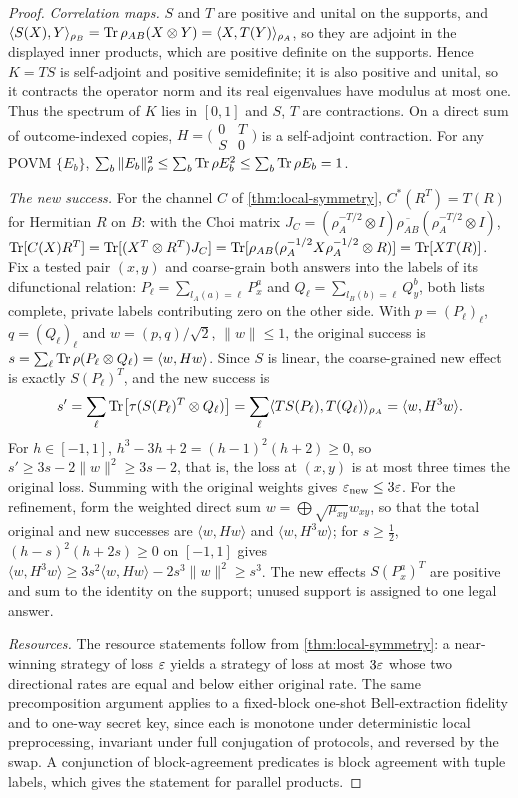 \begin{proof}
\emph{Correlation maps.} $S$ and $T$ are positive and unital on the supports, and
$\langle S(X),Y\rangle_{\rho_B}=\operatorname{Tr}\rho_{AB}(X\otimes Y)=\langle X,T(Y)\rangle_{\rho_A}$, so they are adjoint in the displayed inner
products, which are positive definite on the supports. Hence $K=TS$ is self-adjoint and positive semidefinite; it is also
positive and unital, so it contracts the operator norm and its real eigenvalues have modulus at most one. Thus the
spectrum of $K$ lies in $[0,1]$ and $S$, $T$ are contractions. On a direct sum of outcome-indexed copies,
$H=\bigl(\begin{smallmatrix}0&T\\S&0\end{smallmatrix}\bigr)$ is a self-adjoint contraction. For any POVM $\{E_b\}$,
$\sum_b\|E_b\|_\rho^2\le\sum_b\operatorname{Tr}\rho E_b^2\le\sum_b\operatorname{Tr}\rho E_b=1$.

\emph{The new success.} For the channel $C$ of \cref{thm:local-symmetry}, $C^*(R^T)=T(R)$ for Hermitian $R$ on $B$: with the
Choi matrix $J_C=(\rho_A^{-T/2}\otimes I)\overline{\rho_{AB}}(\rho_A^{-T/2}\otimes I)$,
$\operatorname{Tr}[C(X)R^T]=\operatorname{Tr}[(X^T\otimes R^T)J_C]=\operatorname{Tr}[\rho_{AB}(\rho_A^{-1/2}X\rho_A^{-1/2}\otimes R)]=\operatorname{Tr}[XT(R)]$. Fix a tested pair $(x,y)$ and
coarse-grain both answers into the labels of its difunctional relation: $P_\ell=\sum_{l_A(a)=\ell}P_x^a$ and
$Q_\ell=\sum_{l_B(b)=\ell}Q_y^b$, both lists complete, private labels contributing zero on the other side. With
$p=(P_\ell)_\ell$, $q=(Q_\ell)_\ell$ and $w=(p,q)/\sqrt2$, $\|w\|\le1$, the original success is
$s=\sum_\ell\operatorname{Tr}\rho(P_\ell\otimes Q_\ell)=\langle w,Hw\rangle$. Since $S$ is linear, the coarse-grained new effect is exactly
$S(P_\ell)^T$, and the new success is
\[
s'=\sum_\ell\operatorname{Tr}\bigl[\tau(S(P_\ell)^T\otimes Q_\ell)\bigr]=\sum_\ell\langle TS(P_\ell),T(Q_\ell)\rangle_{\rho_A}=\langle w,H^3w\rangle .
\]
For $h\in[-1,1]$, $h^3-3h+2=(h-1)^2(h+2)\ge0$, so $s'\ge3s-2\|w\|^2\ge3s-2$, that is, the loss at $(x,y)$ is at most three
times the original loss. Summing with the original weights gives $\varepsilon_{\mathrm{new}}\le3\varepsilon$. For the refinement, form the
weighted direct sum $w=\bigoplus\sqrt{\mu_{xy}}w_{xy}$, so that the total original and new successes are $\langle w,Hw\rangle$ and
$\langle w,H^3w\rangle$; for $s\ge\frac12$, $(h-s)^2(h+2s)\ge0$ on $[-1,1]$ gives $\langle w,H^3w\rangle\ge3s^2\langle w,Hw\rangle-2s^3\|w\|^2\ge
s^3$. The new effects $S(P^a_x)^T$ are positive and sum to the identity on the support; unused support is assigned to one
legal answer.

\emph{Resources.} The resource statements follow from \cref{thm:local-symmetry}: a near-winning strategy of loss $\varepsilon$
yields a strategy of loss at most $3\varepsilon$ whose two directional rates are equal and below either original rate. The same
precomposition argument applies to a fixed-block one-shot Bell-extraction fidelity and to one-way secret key, since each
is monotone under deterministic local preprocessing, invariant under full conjugation of protocols, and reversed by the
swap. A conjunction of block-agreement predicates is block agreement with tuple labels, which gives the statement for
parallel products.
\end{proof}

